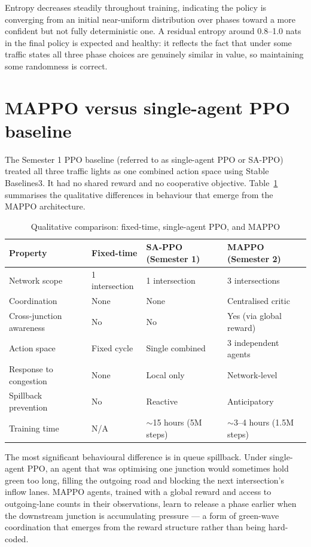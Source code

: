 \documentclass[11pt, a4paper]{report}
\begin{document}
Entropy decreases steadily throughout training, indicating the policy is converging from an initial near-uniform distribution over phases toward a more confident but not fully deterministic one. A residual entropy around 0.8--1.0 nats in the final policy is expected and healthy: it reflects the fact that under some traffic states all three phase choices are genuinely similar in value, so maintaining some randomness is correct.

\section{MAPPO versus single-agent PPO baseline}

The Semester 1 PPO baseline (referred to as single-agent PPO or SA-PPO) treated all three traffic lights as one combined action space using Stable Baselines3. It had no shared reward and no cooperative objective. Table~\ref{tab:mappo_vs_ppo} summarises the qualitative differences in behaviour that emerge from the MAPPO architecture.

\begin{table}[H]
\centering
\caption{Qualitative comparison: fixed-time, single-agent PPO, and MAPPO}
\label{tab:mappo_vs_ppo}
\begin{tabular}{p{3.2cm}p{3.5cm}p{3.5cm}p{3.5cm}}
\toprule
\textbf{Property} & \textbf{Fixed-time} & \textbf{SA-PPO (Semester 1)} & \textbf{MAPPO (Semester 2)} \\
\midrule
Network scope & 1 intersection & 1 intersection & 3 intersections \\
Coordination & None & None & Centralised critic \\
Cross-junction awareness & No & No & Yes (via global reward) \\
Action space & Fixed cycle & Single combined & 3 independent agents \\
Response to congestion & None & Local only & Network-level \\
Spillback prevention & No & Reactive & Anticipatory \\
Training time & N/A & $\sim$15 hours (5M steps) & $\sim$3--4 hours (1.5M steps) \\
\bottomrule
\end{tabular}
\end{table}

The most significant behavioural difference is in queue spillback. Under single-agent PPO, an agent that was optimising one junction would sometimes hold green too long, filling the outgoing road and blocking the next intersection's inflow lanes. MAPPO agents, trained with a global reward and access to outgoing-lane counts in their observations, learn to release a phase earlier when the downstream junction is accumulating pressure --- a form of green-wave coordination that emerges from the reward structure rather than being hard-coded.
\end{document}
